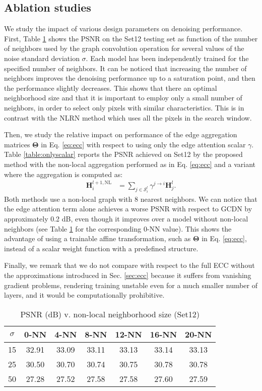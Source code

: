 \documentclass[journal]{IEEEtran}
\newcommand{\Hb}{\mathbf{H}}
\newcommand{\Sx}{\mathcal{S}}
\begin{document}
\subsection{Ablation studies}
We study the impact of various design parameters on denoising performance. First, Table \ref{table:psnr_vs_nn} shows the PSNR on the Set12 testing set as function of the number of neighbors used by the graph convolution operation for several values of the noise standard deviation $\sigma$. Each model has been independently trained for the specified number of neighbors.  It can be noticed that increasing the number of neighbors improves the denoising performance up to a saturation point, and then the performance slightly decreases. This shows that there an optimal neighborhood size and that it is important to employ only a small number of neighbors, in order to select only pixels with similar characteristics. This is in contrast with the NLRN method which uses all the pixels in the search window.

Then, we study the relative impact on performance of the edge aggregation matrices $\bm{\Theta}$ in Eq. \eqref{eq:ecc} with respect to using only the edge attention scalar $\gamma$. Table \ref{table:onlyscalar} reports the PSNR achieved on Set12 by the proposed method with the non-local aggregation performed as in Eq. \eqref{eq:ecc} and a variant where the aggregation is computed as:
\begin{align*}
    \Hb_i^{l+1,\mathrm{NL}}  &=  \sum_{j\in\Sx_i^l} \gamma^{j\to i} \Hb_j^l .
\end{align*}
Both methods use a non-local graph with 8 nearest neighbors.
We can notice that the edge attention term alone achieves a worse PSNR with respect to GCDN by approximately 0.2 dB, even though it improves over a model without non-local neighbors (see Table \ref{table:psnr_vs_nn} for the corresponding 0-NN value). This shows the advantage of using a trainable affine transformation, such as $\bm{\Theta}$ in Eq. \eqref{eq:ecc}, instead of a scalar weight function with a predefined structure. 

Finally, we remark that we do not compare with respect to the full ECC without the approximations introduced in Sec. \ref{sec:ecc} because it suffers from vanishing gradient problems, rendering training unstable even for a much smaller number of layers, and it would be computationally prohibitive.

\begin{table} 
\centering
\caption{PSNR (dB) v. non-local neighborhood size (Set12)}
\begin{tabular}{ccccccc}
\hline
$\sigma$ & 0-NN & 4-NN & 8-NN & 12-NN & 16-NN & 20-NN \\ \hline
15       & 32.91 & 33.09 & 33.11 & 33.13 & 33.14 & 33.13 \\ \hline
25       & 30.50 & 30.70 & 30.74 & 30.75 & 30.78 & 30.78 \\ \hline
50       & 27.28 & 27.52 & 27.58 & 27.58 & 27.60 & 27.59 \\ \hline
\end{tabular}
\label{table:psnr_vs_nn}
\end{table}
\end{document}

